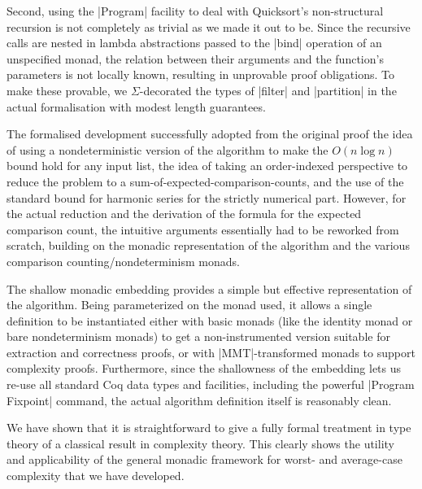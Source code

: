 \documentclass[runningheads]{llncs}
\begin{document}
Second, using the |Program| facility to deal with Quicksort's non-structural recursion is not completely as trivial as we made it out to be. Since the recursive calls are nested in lambda abstractions passed to the |bind| operation of an unspecified monad, the relation between their arguments and the function's parameters is not locally known, resulting in unprovable proof obligations. To make these provable, we $\Sigma$-decorated the types of |filter| and |partition| in the actual formalisation with modest length guarantees.

The formalised development successfully adopted from the original proof the idea of using a nondeterministic version of the algorithm to make the $O(n \log n)$ bound hold for any input list, the idea of taking an order-indexed perspective to reduce the problem to a sum-of-expected-comparison-counts, and the use of the standard bound for harmonic series for the strictly numerical part. However, for the actual reduction and the derivation of the formula for the expected comparison count, the intuitive arguments essentially had to be reworked from scratch, building on the monadic representation of the algorithm and the various comparison counting/nondeterminism monads.

The shallow monadic embedding provides a simple but effective representation of the algorithm. Being parameterized on the monad used, it allows a single definition to be instantiated either with basic monads (like the identity monad or bare nondeterminism monads) to get a non-instrumented version suitable for extraction and correctness proofs, or with |MMT|-transformed monads to support complexity proofs. Furthermore, since the shallowness of the embedding lets us re-use all standard Coq data types and facilities, including the powerful |Program Fixpoint| command, the actual algorithm definition itself is reasonably clean.

We have shown that it is straightforward to give a fully formal treatment in type theory of a classical result in complexity theory. This clearly shows the utility and applicability of the general monadic framework for worst- and average-case complexity that we have developed. 



\end{document}

